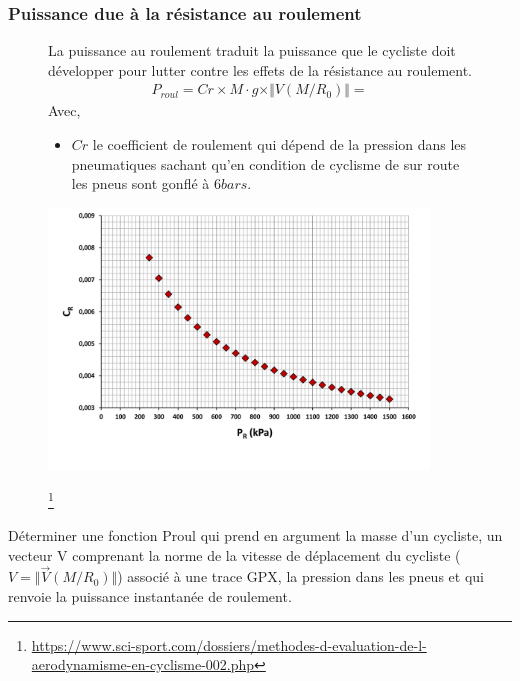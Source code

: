 \subsubsection{Puissance due à la résistance au roulement}

\begin{figure}[!htb]
\begin{minipage}{0.5\textwidth}
La puissance au roulement traduit la puissance que le cycliste doit développer pour lutter contre les effets de la résistance au roulement.
\begin{align*}
P_{roul}=Cr\times M\cdot g\times \Vert V(M/R_0)\Vert=
\end{align*}
Avec,
\begin{itemize}
\item $Cr$ le coefficient de roulement qui dépend de la pression dans les pneumatiques sachant qu'en condition de cyclisme de sur route les pneus sont gonflé à $6bars$.
\end{itemize}
\end{minipage}
\begin{minipage}{0.5\textwidth}
\begin{center}
\includegraphics[width=0.9\textwidth]{resistance_roulement.png}
\caption{\label{res_roul}}
\footnote{\url{https://www.sci-sport.com/dossiers/methodes-d-evaluation-de-l-aerodynamisme-en-cyclisme-002.php}} 
\end{center}
\end{minipage}
\end{figure}

\question{} Déterminer une fonction Proul qui prend en argument la masse d'un cycliste, un vecteur V comprenant la norme de la vitesse de déplacement du cycliste ($V=\Vert \overrightarrow{V}(M/R_0)\Vert$) associé à une trace GPX, la pression dans les pneus et qui renvoie la puissance instantanée de roulement.

